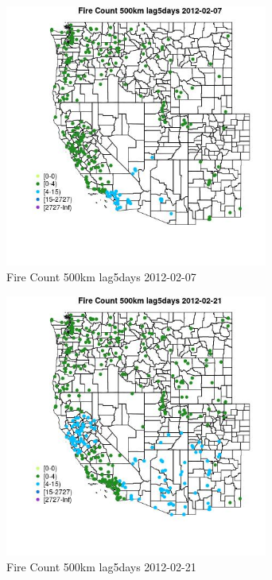 \begin{figure} 
\centering  
\includegraphics[width=0.77\textwidth]{Code_Outputs/Report_ML_input_PM25_Step4_part_f_de_duplicated_aveswNAs_MapObsFire_Count_500km_lag5days2012-02-07.jpg} 
\caption{\label{fig:Report_ML_input_PM25_Step4_part_f_de_duplicated_aveswNAsMapObsFire_Count_500km_lag5days2012-02-07}Fire Count 500km lag5days 2012-02-07} 
\end{figure} 
 

\begin{figure} 
\centering  
\includegraphics[width=0.77\textwidth]{Code_Outputs/Report_ML_input_PM25_Step4_part_f_de_duplicated_aveswNAs_MapObsFire_Count_500km_lag5days2012-02-21.jpg} 
\caption{\label{fig:Report_ML_input_PM25_Step4_part_f_de_duplicated_aveswNAsMapObsFire_Count_500km_lag5days2012-02-21}Fire Count 500km lag5days 2012-02-21} 
\end{figure} 
 

